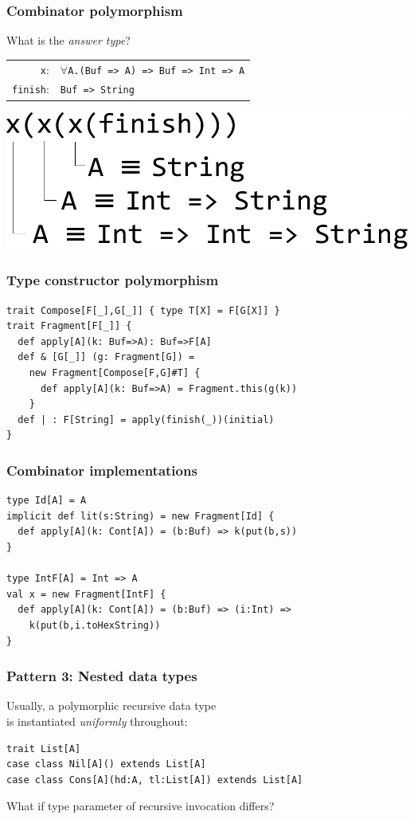 \documentclass[14pt,t,usepdftitle=false,
xcolornames=x11names,svgnames,dvipsnames]{beamer}
\begin{document}
\begin{frame}[fragile]
  \frametitle{Combinator polymorphism}
  What is the \emph{answer type}?
\medskip

    \begin{tabular}[t]{rl}
      \texttt{x}: & $\forall$\texttt{A.(Buf => A) => Buf => Int => A}
      \\
      \hfill\texttt{finish}: &\texttt{Buf => String}
  \end{tabular}

\begin{center}
  \includegraphics[scale=.42]{typeapp}
\end{center}

\end{frame}

\begin{frame}[fragile]
  \frametitle{Type constructor polymorphism}
\begin{lstlisting}[style=scala,moreemph={Buf}]
trait Compose[F[_],G[_]] { type T[X] = F[G[X]] }
trait Fragment[F[_]] {
  def apply[A](k: Buf=>A): Buf=>F[A]
  def & [G[_]] (g: Fragment[G]) =
    new Fragment[Compose[F,G]#T] {
      def apply[A](k: Buf=>A) = Fragment.this(g(k))
    }
  def | : F[String] = apply(finish(_))(initial)
}
\end{lstlisting}
\end{frame}

\begin{frame}[fragile]
  \frametitle{Combinator implementations}
\begin{lstlisting}[style=scala,moreemph={Buf}]
type Id[A] = A
implicit def lit(s:String) = new Fragment[Id] {
  def apply[A](k: Cont[A]) = (b:Buf) => k(put(b,s))
}

type IntF[A] = Int => A
val x = new Fragment[IntF] {
  def apply[A](k: Cont[A]) = (b:Buf) => (i:Int) =>
    k(put(b,i.toHexString))
}
\end{lstlisting}
\end{frame}

\begin{frame}[fragile]
  \frametitle{Pattern 3: Nested data types}
  Usually, a polymorphic recursive data type\\ is instantiated
  \emph{uniformly} throughout:
\begin{lstlisting}[style=scala]
trait List[A]
case class Nil[A]() extends List[A]
case class Cons[A](hd:A, tl:List[A]) extends List[A]
\end{lstlisting}
  What if type parameter of recursive invocation differs?
\end{frame}
\end{document}
